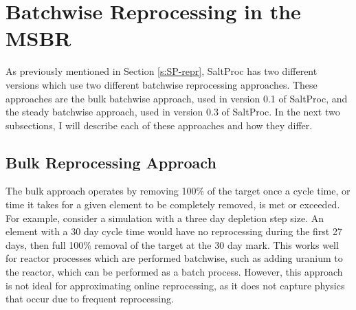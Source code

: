 \section{Batchwise Reprocessing in the MSBR}
\label{s:batch-generic}

As previously mentioned in Section \ref{s:SP-repr}, SaltProc has two different versions which use two different batchwise reprocessing approaches.
These approaches are the bulk batchwise approach, used in version 0.1 of SaltProc, and the steady batchwise approach, used in version 0.3 of SaltProc. In the next two subsections, I will describe each of these approaches and how they differ.


\subsection{Bulk Reprocessing Approach}


The bulk approach operates by removing 100\% of the target once a cycle time, or time it takes for a given element to be completely removed, is met or exceeded.
For example, consider a simulation with a three day depletion step size. An element with a 30 day cycle time would have no reprocessing during the first 27 days, then full 100\% removal of the target at the 30 day mark. This works well for reactor processes which are performed batchwise, such as adding uranium to the reactor, which can be performed as a batch process. However, this approach is not ideal for approximating online reprocessing, as it does not capture physics that occur due to frequent reprocessing.

